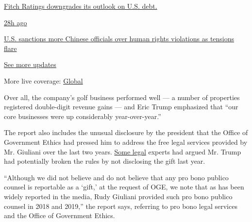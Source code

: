 \href{https://www.nytimes3xbfgragh.onion/live/2020/07/31/business/stock-market-today-coronavirus?action=click\&pgtype=Article\&state=default\&region=MAIN_CONTENT_1\&context=storylines_live_updates\#fitch-ratings-downgrades-its-outlook-on-us-debt}{Fitch
Ratings downgrades its outlook on U.S. debt.}

\href{https://www.nytimes3xbfgragh.onion/live/2020/07/31/business/stock-market-today-coronavirus?action=click\&pgtype=Article\&state=default\&region=MAIN_CONTENT_1\&context=storylines_live_updates\#us-sanctions-more-chinese-officials-over-human-rights-violations-as-tensions-flare}{28h
ago}

\href{https://www.nytimes3xbfgragh.onion/live/2020/07/31/business/stock-market-today-coronavirus?action=click\&pgtype=Article\&state=default\&region=MAIN_CONTENT_1\&context=storylines_live_updates\#us-sanctions-more-chinese-officials-over-human-rights-violations-as-tensions-flare}{U.S.
sanctions more Chinese officials over human rights violations as
tensions flare}

\href{https://www.nytimes3xbfgragh.onion/live/2020/07/31/business/stock-market-today-coronavirus?action=click\&pgtype=Article\&state=default\&region=MAIN_CONTENT_1\&context=storylines_live_updates}{See
more updates}

More live coverage:
\href{https://www.nytimes3xbfgragh.onion/2020/08/01/world/coronavirus-covid-19.html?action=click\&pgtype=Article\&state=default\&region=MAIN_CONTENT_1\&context=storylines_live_updates}{Global}

Over all, the company's golf business performed well --- a number of
properties registered double-digit revenue gains --- and Eric Trump
emphasized that ``our core businesses were up considerably
year-over-year.''

The report also includes the unusual disclosure by the president that
the Office of Government Ethics had pressed him to address the free
legal services provided by Mr. Giuliani over the last two years.
\href{https://www.nytimes3xbfgragh.onion/2019/12/13/us/politics/giuliani-trump-financial-disclosure.html}{Some
legal} experts had argued Mr. Trump had potentially broken the rules by
not disclosing the gift last year.

``Although we did not believe and do not believe that any pro bono
publico counsel is reportable as a `gift,' at the request of OGE, we
note that as has been widely reported in the media, Rudy Giuliani
provided such pro bono publico counsel in 2018 and 2019,'' the report
says, referring to pro bono legal services and the Office of Government
Ethics.

